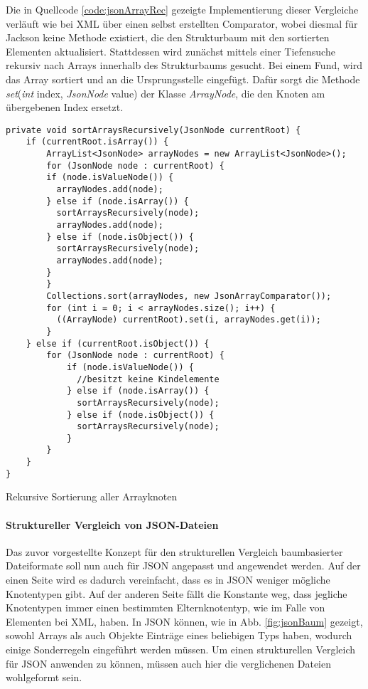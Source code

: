 Die in Quellcode \ref{code:jsonArrayRec} gezeigte Implementierung dieser Vergleiche verläuft wie bei XML über einen selbst erstellten Comparator, wobei diesmal für Jackson keine Methode existiert, die den Strukturbaum mit den sortierten Elementen aktualisiert. Stattdessen wird zunächst mittels einer Tiefensuche rekursiv nach Arrays innerhalb des Strukturbaums gesucht. Bei einem Fund, wird das Array sortiert und an die Ursprungsstelle eingefügt. Dafür sorgt die Methode \emph{set}(\emph{int} index, \emph{JsonNode} value) der Klasse \emph{ArrayNode}, die den Knoten am übergebenen Index ersetzt. 

\begin{listing}[!tb]
\begin{verbatim}
private void sortArraysRecursively(JsonNode currentRoot) {
	if (currentRoot.isArray()) {
	    ArrayList<JsonNode> arrayNodes = new ArrayList<JsonNode>();
	    for (JsonNode node : currentRoot) {
		if (node.isValueNode()) {
		  arrayNodes.add(node);
		} else if (node.isArray()) {
		  sortArraysRecursively(node);
		  arrayNodes.add(node);
		} else if (node.isObject()) {
		  sortArraysRecursively(node);
		  arrayNodes.add(node);
		}
	    }
	    Collections.sort(arrayNodes, new JsonArrayComparator());
	    for (int i = 0; i < arrayNodes.size(); i++) {
	      ((ArrayNode) currentRoot).set(i, arrayNodes.get(i));
	    }
	} else if (currentRoot.isObject()) {
	    for (JsonNode node : currentRoot) {
    	    if (node.isValueNode()) {
    	      //besitzt keine Kindelemente
    	    } else if (node.isArray()) {
    	      sortArraysRecursively(node);
    	    } else if (node.isObject()) {
    	      sortArraysRecursively(node);
    	    }
	    }
	}
}
\end{verbatim}
\caption{Rekursive Sortierung aller Arrayknoten}
\label{code:jsonArrayRec}
\end{listing}

\newpage\paragraph{Struktureller Vergleich von JSON-Dateien}\mbox{}

Das zuvor vorgestellte Konzept für den strukturellen Vergleich baumbasierter Dateiformate soll nun auch für JSON angepasst und angewendet werden. Auf der einen Seite wird es dadurch vereinfacht, dass es in JSON weniger mögliche Knotentypen gibt. Auf der anderen Seite fällt die Konstante weg, dass jegliche Knotentypen immer einen bestimmten Elternknotentyp, wie im Falle von Elementen bei XML, haben. In JSON können, wie in Abb. \ref{fig:jsonBaum} gezeigt, sowohl Arrays als auch Objekte Einträge eines beliebigen Typs haben, wodurch einige Sonderregeln eingeführt werden müssen. Um einen strukturellen Vergleich für JSON anwenden zu können, müssen auch hier die verglichenen Dateien wohlgeformt sein.

